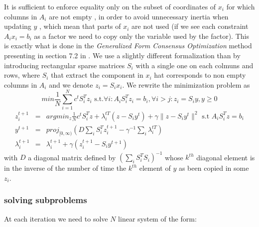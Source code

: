 \documentclass[11pt]{article}
\begin{document}
It is sufficient to enforce equality only on the subset of coordinates of $x_i$ for which columns in $A_i$ are not empty , in order to avoid unnecessary inertia when updating $y$ , which mean that parts of $x_i$ are not used (if we see each constraint $A_i x_i= b_i$ as a factor we need to copy only the variable used by the factor). This is exactly what is done in the \textit{Generalized Form Consensus Optimization} method presenting in section 7.2 in \cite{Boyd2010}. 
We use a slightly different formalization than  \cite{Boyd2010} by introducing rectangular sparse matrices $S_i$ with a single one on each colmuns and rows, where $S_i$ that extract the component in $x_i$ hat corresponds to non empty columns in $A_i$  and we denote $z_i=S_ix_i$.
We rewrite the minimization problem as
\begin{equation}
min \frac{1}{N}\sum_{i=1}^N c^t S_i^T z_i \text{ s.t.} \forall i : A_iS_i^T z_i = b_i , \forall i>j: z_i=S_iy, y\geq 0
\end{equation}
\begin{eqnarray}
z_i^{t+1}&=&argmin_z  \frac{1}{N}c^tS_i^T z +\lambda_i^{tT} (z-S_iy^t)+\gamma\|z-S_iy^t\|^2 \text{ s.t } A_iS_i^Tz=b_i\\
y^{t+1}&=&proj_{[0,\infty)} (D\sum_i S_i^Tz_i^{t+1}-\gamma^{-1} \sum_i \lambda_i^{tT} )\\
\lambda_i^{t+1}&=&\lambda_i^{t+1}+\gamma(z_i^{t+1}-S_iy^{t+1})
\label{eqn:Generalized_Form_Consensus_Optimization}
\end{eqnarray}
with $D$ a diagonal matrix defined by $(\sum_i S_i^TS_i)^{-1}$ whose $k^{th}$ diagonal element is in the inverse of the number of time the $k^{th}$ element of $y$ as been copied in some $z_i$. 

\subsubsection{solving subproblems}

At each iteration we need to solve $N$ linear system of the form:
\end{document}
